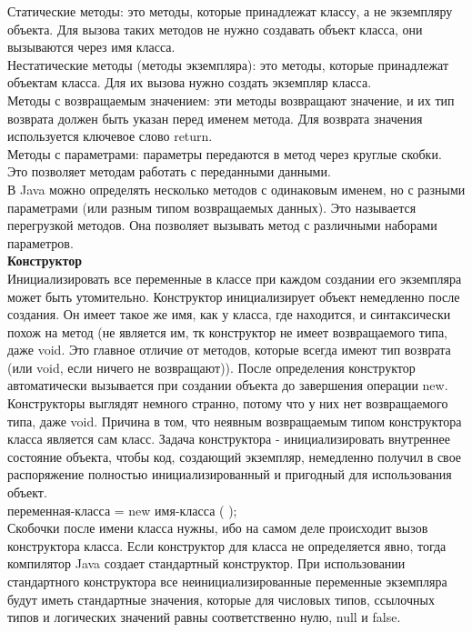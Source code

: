 Статические методы: это методы, которые принадлежат классу, а не экземпляру объекта. Для вызова таких методов не нужно создавать объект класса, они вызываются через имя класса. \\
Нестатические методы (методы экземпляра): это методы, которые принадлежат объектам класса. Для их вызова нужно создать экземпляр класса. \\
Методы с возвращаемым значением: эти методы возвращают значение, и их тип возврата должен быть указан перед именем метода. Для возврата значения используется ключевое слово return. \\
Методы с параметрами: параметры передаются в метод через круглые скобки. Это позволяет методам работать с переданными данными. \\
В Java можно определять несколько методов с одинаковым именем, но с разными параметрами (или разным типом возвращаемых данных). Это называется перегрузкой методов. Она позволяет вызывать метод с различными наборами параметров. \\
\textbf{Конструктор} \\
Инициализировать все переменные в классе при каждом создании его экземпляра может быть утомительно. Конструктор инициализирует объект немедленно после создания. Он имеет такое же имя, как у класса, где находится, и синтаксически похож на метод (не является им, тк конструктор не имеет возвращаемого типа, даже void. Это главное отличие от методов, которые всегда имеют тип возврата (или void, если ничего не возвращают)). После определения конструктор автоматически вызывается при создании объекта до завершения операции new. Конструкторы выглядят немного странно, потому что у них нет возвращаемого типа, даже void. Причина в том, что неявным возвращаемым типом конструктора класса является сам класс. Задача конструктора - инициализировать внутреннее состояние объекта, чтобы код, создающий экземпляр, немедленно получил в свое распоряжение полностью инициализированный и пригодный для использования
объект. \\
переменная-класса = new имя-класса ( ); \\
Скобочки после имени класса нужны, ибо на самом деле происходит вызов конструктора класса. Если конструктор для класса не определяется явно, тогда компилятор Java создает стандартный конструктор. При использовании стандартного конструктора все неинициализированные переменные экземпляра будут иметь стандартные значения, которые для числовых типов, ссылочных типов и логических значений равны соответственно нулю, null и false. \\
